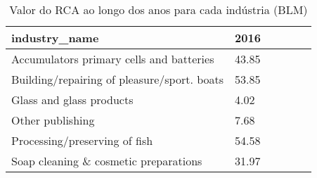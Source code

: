 \begin{table}
\centering
\caption{Valor do RCA ao longo dos anos para cada indústria (BLM)}
\begin{tabular}{p{6cm}p{1.5cm}p{1.5cm}p{1.5cm}p{1.5cm}p{1.5cm}}
\toprule
                              industry\_name &  2016 \\
\midrule
   Accumulators primary cells and batteries & 43.85 \\
Building/repairing of pleasure/sport. boats & 53.85 \\
                   Glass and glass products &  4.02 \\
                           Other publishing &  7.68 \\
              Processing/preserving of fish & 54.58 \\
      Soap cleaning \& cosmetic preparations & 31.97 \\
\bottomrule
\end{tabular}
\end{table}
